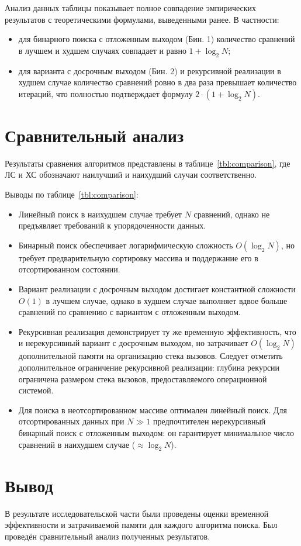 Анализ данных таблицы показывает полное совпадение эмпирических результатов с теоретическими формулами, выведенными ранее. В частности:
\begin{itemize}
	\item для бинарного поиска с отложенным выходом (Бин. 1) количество сравнений в лучшем и худшем случаях совпадает и равно $1 + \log_2 N$;
	\item для варианта с досрочным выходом (Бин. 2) и рекурсивной реализации в худшем случае количество сравнений ровно в два раза превышает количество итераций, что полностью подтверждает формулу $2 \cdot (1 + \log_2 N)$.
\end{itemize}

\section{Сравнительный анализ}

Результаты сравнения алгоритмов представлены в таблице~\ref{tbl:comparison}, где ЛС и ХС обозначают наилучший и наихудший случаи соответственно.


Выводы по таблице~\ref{tbl:comparison}:

\begin{itemize}
	\item Линейный поиск в наихудшем случае требует $N$ сравнений, однако не предъявляет требований к упорядоченности данных.
	
	\item Бинарный поиск обеспечивает логарифмическую сложность $O(\log_2 N)$, но требует предварительную сортировку массива и поддержание его в отсортированном состоянии.
	
	\item Вариант реализации с досрочным выходом достигает константной сложности $O(1)$ в лучшем случае, однако в худшем случае выполняет вдвое больше сравнений по сравнению с вариантом с отложенным выходом.
	
	\item Рекурсивная реализация демонстрирует ту же временную эффективность, что и нерекурсивный вариант с досрочным выходом, но затрачивает $O(\log_2 N)$ дополнительной памяти на организацию стека вызовов. Следует отметить дополнительное ограничение рекурсивной реализации: глубина рекурсии ограничена размером стека вызовов, предоставляемого операционной системой.
	
	\item Для поиска в неотсортированном массиве оптимален линейный поиск. Для отсортированных данных при $N \gg 1$ предпочтителен нерекурсивный бинарный поиск с отложенным выходом: он гарантирует минимальное число сравнений в наихудшем случае ($\approx \log_2 N$).
\end{itemize}

\section{Вывод}

В результате исследовательской части были проведены оценки временной эффективности и затрачиваемой памяти для каждого алгоритма поиска. Был проведён сравнительный анализ полученных результатов.